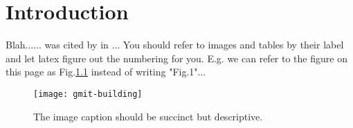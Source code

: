 \chapter{Introduction}
Blah...... was cited by \cite{zasloff2002antimicrobial} in ... You should refer to images and tables by their label and let latex figure out the numbering for you. E.g. we can refer to the figure on this page as Fig.\ref{image:myImageName} instead of writing "Fig.1"...

\begin{figure}[h!]
	\caption{The image caption should be succinct but descriptive.}
	\label{image:myImageName}
	\centering
	\texttt{[image: gmit-building]}
\end{figure}	
